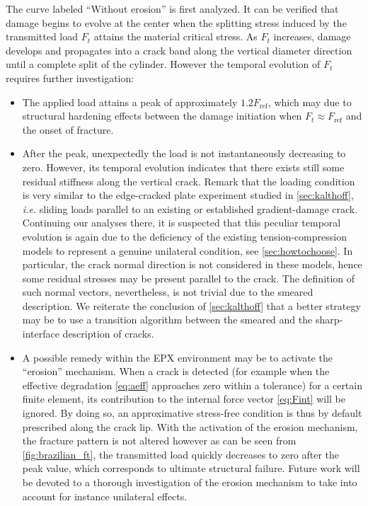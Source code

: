 The curve labeled ``Without erosion'' is first analyzed. It can be verified that damage begins to evolve at the center when the splitting stress induced by the transmitted load $F_t$ attains the material critical stress. As $F_t$ increases, damage develops and propagates into a crack band along the vertical diameter direction until a complete split of the cylinder. However the temporal evolution of $F_t$ requires further investigation:
\begin{itemize}
\item The applied load attains a peak of approximately $1.2F_\mathrm{ref}$, which may due to structural hardening effects between the damage initiation when $F_t\approx F_\mathrm{ref}$ and the onset of fracture.

\item After the peak, unexpectedly the load is not instantaneously decreasing to zero. However, its temporal evolution indicates that there exists still some residual stiffness along the vertical crack. Remark that the loading condition is very similar to the edge-cracked plate experiment studied in \cref{sec:kalthoff}, \emph{i.e.} sliding loads parallel to an existing or established gradient-damage crack. Continuing our analyses there, it is suspected that this peculiar temporal evolution is again due to the deficiency of the existing tension-compression models to represent a genuine unilateral condition, see \cref{sec:howtochoose}. In particular, the crack normal direction is not considered in these models, hence some residual stresses may be present parallel to the crack. The definition of such normal vectors, nevertheless, is not trivial due to the smeared description. We reiterate the conclusion of \cref{sec:kalthoff} that a better strategy may be to use a transition algorithm between the smeared and the sharp-interface description of cracks.

\item A possible remedy within the EPX environment may be to activate the ``erosion'' mechanism. When a crack is detected (for example when the effective degradation \eqref{eq:aeff} approaches zero within a tolerance) for a certain finite element, its contribution to the internal force vector \eqref{eq:Fint} will be ignored. By doing so, an approximative stress-free condition is thus by default prescribed along the crack lip. With the activation of the erosion mechanism, the fracture pattern is not altered however as can be seen from \cref{fig:brazilian_ft}, the transmitted load quickly decreases to zero after the peak value, which corresponds to ultimate structural failure. Future work will be devoted to a thorough investigation of the erosion mechanism to take into account for instance unilateral effects.
\end{itemize}

